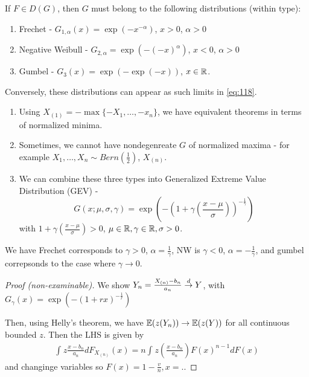 \begin{thm}
  \label{defn:extreme_value_theory:3}
  If $F \in D(G)$, then $G$ must belong to the following distributions
  (within type):

  \begin{enumerate}
  \item Frechet - $G_{1, \alpha}(x) = \exp(-x^{-\alpha})$, $x > 0$,
    $\alpha > 0$
  \item Negative Weibull - $G_{2, \alpha} = \exp(- (-x)^{\alpha})$, $x
    < 0$, $\alpha > 0$
  \item Gumbel - $G_{3}(x) = \exp(-\exp(-x))$, $x \in \mathbb{R}$.
  \end{enumerate}

  Conversely, these distributions can appear as such limits in \eqref{eq:118}.
\end{thm}

\begin{remark}
  \begin{enumerate}
  \item Using $X_{(1)} = -\max \{ -X_{1}, \dots, -x_{n} \} $, we have
    equivalent theorems in terms of normalized minima.
  \item Sometimes, we cannot have nondegenreate $G$ of normalized
    maxima  - for example $X_{1}, \dots, X_{n} \sim
    Bern(\frac{1}{2})$, $X_{(n)}$.
  \item We can combine these three types into Generalized Extreme
    Value Distribution (GEV) -
    \begin{equation}
      \label{eq:122}
      G(x; \mu, \sigma, \gamma) = \exp(- (1 + \gamma(\frac{x-\mu}{\sigma}))^{-\frac{1}{\gamma}})
    \end{equation} with $1 + \gamma(\frac{x - \mu}{\sigma}) > 0$, $\mu
    \in \mathbb{R}, \gamma \in \mathbb{R}, \sigma > 0$.
  \end{enumerate}

  We have Frechet corresponds to $\gamma > 0$, $\alpha =
  \frac{1}{\gamma} $, NW is $\gamma < 0$, $\alpha =
  -\frac{1}{\gamma}$, and gumbel correpsonds to the case where $\gamma
  \rightarrow 0$.
\end{remark}

\begin{proof}[Proof (non-examinable)]
  We show $Y_{n} = \frac{X_{(n)} - b_{n}}{a_{n}} \overset{d}{\rightarrow} Y$, with
  $G_{\gamma}(x) = \exp(- (1 + rx)^{-\frac{1}{r}})$

  Then, using Helly's theorem, we have $\E{z(Y_{n})} \rightarrow
  \E{z(Y)}$ for all continuous bounded $z$.  Then the LHS is given by 
  \begin{align}
    \label{eq:123}
    \int_{}^{} z \frac{x - b_{n}}{a_{n}} d F_{X_{(n)}}(x) = n
    \int_{}^{} z(\frac{x - b_{n}}{a_{n}}) F(x)^{n-1} dF(x)
  \end{align} and changinge variables so $F(x) = 1 - \frac{v}{n}, x = ..$
  
\end{proof}


